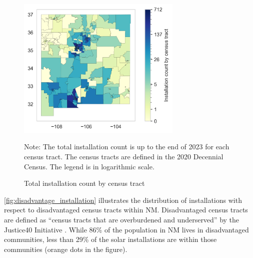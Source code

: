 \documentclass[12pt,twoside,letterpaper]{article}
\begin{document}
\begin{figure}[H]
    \centering
\includegraphics[width=0.7\textwidth]{figures/tract_count_map.png}
    \caption{Total installation count by census tract}
    \label{fig:tract_map}
    \begin{flushleft}
        \footnotesize Note: The total installation count is up to the end of 2023 for each census tract. The census tracts are defined in the 2020 Decennial Census. The legend is in logarithmic scale.
    \end{flushleft}
\end{figure}

\autoref{fig:disadvantage_installation} illustrates the distribution of installations with respect to disadvantaged census tracts within NM. Disadvantaged census tracts are defined as “census tracts that are overburdened and underserved” by the Justice40 Initiative \parencite{justice40}. While 86\% of the population in NM lives in disadvantaged communities, less than 29\% of the solar installations are within those communities (orange dots in the figure).
\end{document}
